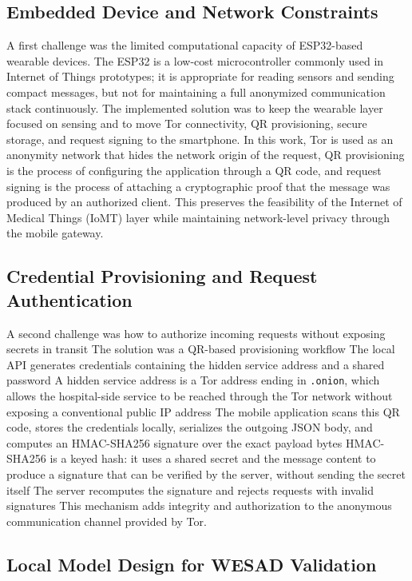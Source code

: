 \documentclass[12pt]{article}
\begin{document}
\subsection{Embedded Device and Network Constraints}

A first challenge was the limited computational capacity of ESP32-based wearable devices. The ESP32 is a low-cost microcontroller commonly used in Internet of Things prototypes; it is appropriate for reading sensors and sending compact messages, but not for maintaining a full anonymized communication stack continuously. The implemented solution was to keep the wearable layer focused on sensing and to move Tor connectivity, QR provisioning, secure storage, and request signing to the smartphone. In this work, Tor is used as an anonymity network that hides the network origin of the request, QR provisioning is the process of configuring the application through a QR code, and request signing is the process of attaching a cryptographic proof that the message was produced by an authorized client. This preserves the feasibility of the Internet of Medical Things (IoMT) layer while maintaining network-level privacy through the mobile gateway.

\subsection{Credential Provisioning and Request Authentication}

A second challenge was how to authorize incoming requests without exposing secrets in transit The solution was a QR-based provisioning workflow The local API generates credentials containing the hidden service address and a shared password A hidden service address is a Tor address ending in \texttt{.onion}, which allows the hospital-side service to be reached through the Tor network without exposing a conventional public IP address The mobile application scans this QR code, stores the credentials locally, serializes the outgoing JSON body, and computes an HMAC-SHA256 signature over the exact payload bytes HMAC-SHA256 is a keyed hash: it uses a shared secret and the message content to produce a signature that can be verified by the server, without sending the secret itself The server recomputes the signature and rejects requests with invalid signatures This mechanism adds integrity and authorization to the anonymous communication channel provided by Tor.

\subsection{Local Model Design for WESAD Validation}
\end{document}
